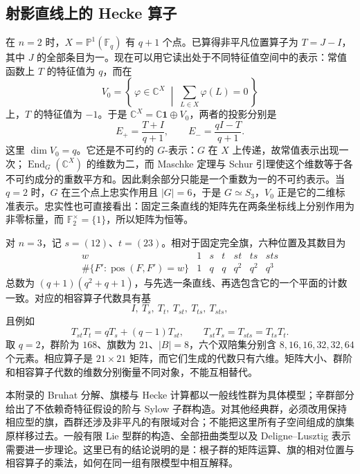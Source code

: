 \subsection{射影直线上的 Hecke 算子}
\label{b5:subsec:F04:03}

在 \(n=2\) 时，\(X=\mathbb P^1(\mathbb F_q)\) 有 \(q+1\) 个点。已算得非平凡位置算子为 \(T=J-I\)，其中 \(J\) 的全部条目为一。现在可以用它读出处于不同特征值空间中的表示：常值函数上 \(T\) 的特征值为 \(q\)，而在
\[
	V_0=\left\{\,\varphi\in\mathbb C^X\;\middle|\;\sum_{L\in X}\varphi(L)=0\,\right\}
\]
上，\(T\) 的特征值为 \(-1\)。于是 \(\mathbb C^X=\mathbb C\mathbf1\oplus V_0\)，两者的投影分别是
\[
	E_+=\frac{T+I}{q+1},\qquad E_-=\frac{qI-T}{q+1}.
\]
这里 \(\dim V_0=q\)。它还是不可约的 \(G\)-表示：\(G\) 在 \(X\) 上传递，故常值表示出现一次；\(\operatorname{End}_G(\mathbb C^X)\) 的维数为二，而 Maschke 定理与 Schur 引理使这个维数等于各不可约成分的重数平方和。因此剩余部分只能是一个重数为一的不可约表示。当 \(q=2\) 时，\(G\) 在三个点上忠实作用且 \(|G|=6\)，于是 \(G\simeq S_3\)，\(V_0\) 正是它的二维标准表示。忠实性也可直接看出：固定三条直线的矩阵先在两条坐标线上分别作用为非零标量，而 \(\mathbb F_2^\times=\{1\}\)，所以矩阵为恒等。

\ProseParagraphBreak
对 \(n=3\)，记 \(s=(12)\)、\(t=(23)\)。相对于固定完全旗，六种位置及其数目为
\[
	\begin{array}{c|rrrrrr}
		w&1&s&t&st&ts&sts\\\hline
		\#\{F':\operatorname{pos}(F,F')=w\}&1&q&q&q^2&q^2&q^3
	\end{array}
\]
总数为 \((q+1)(q^2+q+1)\)，与先选一条直线、再选包含它的一个平面的计数一致。对应的相容算子代数具有基
\[
	I,\ T_s,\ T_t,\ T_{st},\ T_{ts},\ T_{sts},
\]
且例如
\[
	T_{st}T_t=qT_s+(q-1)T_{st},\qquad
	T_{st}T_s=T_{sts}=T_{ts}T_t.
\]
取 \(q=2\)，群阶为 \(168\)、旗数为 \(21\)、\(|B|=8\)，六个双陪集分别含 \(8,16,16,32,32,64\) 个元素。相应算子是 \(21\times21\) 矩阵，而它们生成的代数只有六维。矩阵大小、群阶和相容算子代数的维数分别衡量不同对象，不能互相替代。

\ProseParagraphBreak
本附录的 Bruhat 分解、旗楼与 Hecke 计算都以一般线性群为具体模型；辛群部分给出了不依赖奇特征假设的阶与 Sylow 子群构造。对其他经典群，必须改用保持相应型的旗，酉群还涉及非平凡的有限域对合；不能把这里所有子空间组成的旗集原样移过去。一般有限 Lie 型群的构造、全部扭曲类型以及 Deligne--Lusztig 表示需要进一步理论。这里已有的结论说明的是：根子群的矩阵运算、旗的相对位置与相容算子的乘法，如何在同一组有限模型中相互解释。

